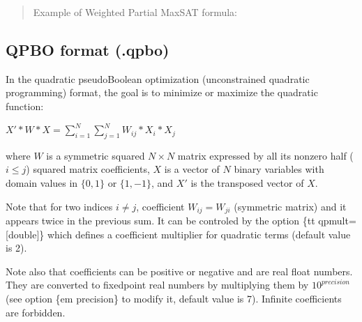 \documentclass[letterpaper,10pt,openany,oneside,english]{sphinxmanual}
\begin{document}
\begin{quote}
\sphinxAtStartPar
Example of Weighted Partial Max\sphinxhyphen{}SAT formula:

\begin{sphinxVerbatim}[commandchars=\\\{\}]
    
    
    
    
   
   
   
\end{sphinxVerbatim}
\end{quote}

\sphinxstepscope


\subsection{QPBO format (.qpbo)}
\label{\detokenize{formats/qpboformat:qpbo-format-qpbo}}\label{\detokenize{formats/qpboformat:qpbo-format}}\label{\detokenize{formats/qpboformat::doc}}
\sphinxAtStartPar
In the quadratic pseudo\sphinxhyphen{}Boolean optimization (unconstrained quadratic programming) format, the goal is to minimize or maximize the quadratic function:

\sphinxAtStartPar
\(X' * W * X = \sum_{i=1}^N \sum_{j=1}^N  W_{ij} * X_i * X_j\)

\sphinxAtStartPar
where \(W\) is a symmetric squared \(N \times N\) matrix expressed by all its non\sphinxhyphen{}zero half (\(i \leq j\)) squared matrix coefficients, \(X\) is a vector of \(N\) binary variables with domain values in \(\{0,1\}\) or \(\{1,-1\}\), and \(X'\) is the transposed vector of \(X\).

\sphinxAtStartPar
Note that for two indices \(i \neq j\), coefficient \(W_{ij} = W_{ji}\) (symmetric matrix) and it appears twice in the previous sum.
It can be controled by the option \{tt \sphinxhyphen{}qpmult={[}double{]}\} which defines a coefficient multiplier for quadratic terms (default value is 2).

\sphinxAtStartPar
Note also that coefficients can be positive or negative and are real float numbers. They are converted to fixed\sphinxhyphen{}point real numbers by multiplying them by \(10^{precision}\) (see option \{em \sphinxhyphen{}precision\} to modify it, default value is 7).  Infinite coefficients are forbidden.
\end{document}
